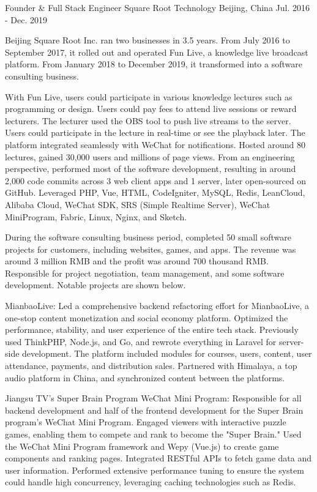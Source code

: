 \begin{cventries}
\cventry
{Founder \& Full Stack Engineer} %
{Square Root Technology} %
{Beijing, China} %
{Jul. 2016 - Dec. 2019} %
{
  \begin{cvitems} %
    \item {Beijing Square Root Inc. ran two businesses in 3.5 years. From July 2016 to September 2017, it rolled out and operated Fun Live, a knowledge live broadcast platform. From January 2018 to December 2019, it transformed into a software consulting business.}
    \item {With Fun Live, users could participate in various knowledge lectures such as programming or design. Users could pay fees to attend live sessions or reward lecturers. The lecturer used the OBS tool to push live streams to the server. Users could participate in the lecture in real-time or see the playback later. The platform integrated seamlessly with WeChat for notifications. Hosted around 80 lectures, gained 30,000 users and millions of page views. From an engineering perspective, performed most of the software development, resulting in around 2,000 code commits across 3 web client apps and 1 server, later open-sourced on GitHub. Leveraged PHP, Vue, HTML, CodeIgniter, MySQL, Redis, LeanCloud, Alibaba Cloud, WeChat SDK, SRS (Simple Realtime Server), WeChat MiniProgram, Fabric, Linux, Nginx, and Sketch.}
    \item {During the software consulting business period, completed 50 small software projects for customers, including websites, games, and apps. The revenue was around 3 million RMB and the profit was around 700 thousand RMB. Responsible for project negotiation, team management, and some software development. Notable projects are shown below.}
    \item {MianbaoLive: Led a comprehensive backend refactoring effort for MianbaoLive, a one-stop content monetization and social economy platform. Optimized the performance, stability, and user experience of the entire tech stack. Previously used ThinkPHP, Node.js, and Go, and rewrote everything in Laravel for server-side development. The platform included modules for courses, users, content, user attendance, payments, and distribution sales. Partnered with Himalaya, a top audio platform in China, and synchronized content between the platforms.}
    \item {Jiangsu TV's Super Brain Program WeChat Mini Program: Responsible for all backend development and half of the frontend development for the Super Brain program’s WeChat Mini Program. Engaged viewers with interactive puzzle games, enabling them to compete and rank to become the "Super Brain." Used the WeChat Mini Program framework and Wepy (Vue.js) to create game components and ranking pages. Integrated RESTful APIs to fetch game data and user information. Performed extensive performance tuning to ensure the system could handle high concurrency, leveraging caching technologies such as Redis.}

\end{cvitems}}
\end{cventries}
